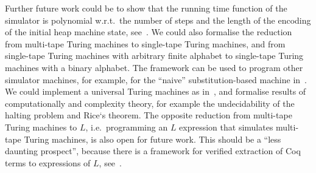 Further future work could be to show that the running time function of the simulator is polynomial w.r.t.\ the number of steps and the length of the
encoding of the initial heap machine state, see~\cite{ForsterLOLA2017}.  We could also formalise the reduction from multi-tape Turing machines to
single-tape Turing machines, and from single-tape Turing machines with arbitrary finite alphabet to single-tape Turing machines with a binary
alphabet.  The framework can be used to program other simulator machines, for example, for the ``naive'' substitution-based machine
in~\cite{KunzeEtAl:2018:Formal}.  We could implement a universal Turing machines as in~\cite{asperti2015}, and formalise results of computationally
and complexity theory, for example the undecidability of the halting problem and Rice`s theorem.  The opposite reduction from multi-tape Turing
machines to $L$, i.e.\ programming an $L$ expression that simulates multi-tape Turing machines, is also open for future work.  This should be a ``less
daunting prospect'', because there is a framework for verified extraction of Coq terms to expressions of $L$, see~\cite{LExtractITP}.


